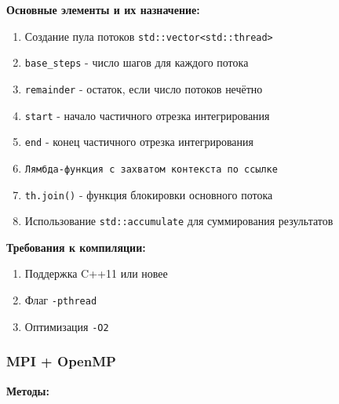 \documentclass[14pt,a4paper]{article}
\begin{document}
\textbf{Основные элементы и их назначение:}
\begin{enumerate}
\item Создание пула потоков \texttt{std::vector<std::thread>}
\item \texttt{base\_steps} - число шагов для каждого потока
\item \texttt{remainder} - остаток, если число потоков нечётно
\item \texttt{start} - начало частичного отрезка интегрирования
\item \texttt{end} - конец частичного отрезка интегрирования
\item  \texttt{Лямбда-функция с захватом контекста по ссылке}
\item \texttt{th.join()} - функция блокировки основного потока
\item Использование \texttt{std::accumulate} для суммирования результатов
\end{enumerate}

\textbf{Требования к компиляции:}
\begin{enumerate}
\item Поддержка C++11 или новее
\item Флаг \texttt{-pthread}
\item Оптимизация \texttt{-O2}
\end{enumerate}

\subsubsection{MPI + OpenMP}
\textbf{Методы:}
\end{document}
